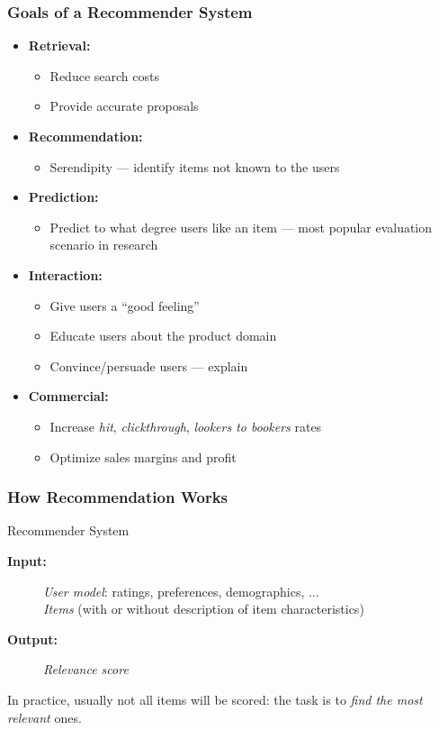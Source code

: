 \documentclass{beamer}
\begin{document}
\begin{frame}[shrink]
    \frametitle{Goals of a Recommender System}
    \begin{itemize}
    \item \textbf{Retrieval:}
        \begin{itemize}
        \item Reduce search costs
        \item Provide accurate proposals
        \end{itemize}
    \item \textbf{Recommendation:}
        \begin{itemize}
        \item Serendipity --- identify items not known to the users
        \end{itemize}
    \item \textbf{Prediction:}
        \begin{itemize}
        \item Predict to what degree users like an item --- most popular
            evaluation scenario in research
        \end{itemize}
    \item \textbf{Interaction:}
        \begin{itemize}
        \item Give users a ``good feeling''
        \item Educate users about the product domain
        \item Convince/persuade users --- explain
        \end{itemize}
    \item \textbf{Commercial:}
        \begin{itemize}
        \item Increase \emph{hit}, \emph{clickthrough}, \emph{lookers to
              bookers} rates
        \item Optimize sales margins and profit
        \end{itemize}
    \end{itemize}
\end{frame} 

\begin{frame}
    \frametitle{How Recommendation Works}
    \begin{block}{Recommender System}
        \begin{description}
        \item[\textbf{Input:}]
            \emph{User model}: ratings, preferences, demographics, ...\\
            \emph{Items} (with or without description of item characteristics)
        \item[\textbf{Output:}] \emph{Relevance score}
        \end{description}
    \end{block}
    In practice, usually not all items will be scored: the task is to
    \emph{find the most relevant} ones.
\end{frame}
\end{document}
